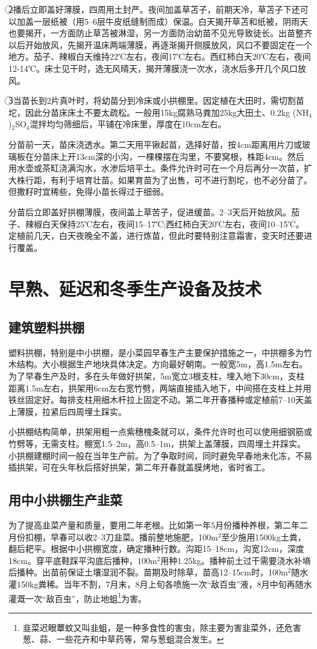 \documentclass{ctexbook}
\begin{document}
\textcircled{2}播后立即盖好薄膜，四周用土封严。夜间加盖草苫子，前期天冷，草苫子下还可以加盖一层纸被（用5--6层牛皮纸缝制而成）保温。白天揭开草苫和纸被，阴雨天也要揭开，一方面防止草苫被淋湿，另一方面防治幼苗不见光导致徒长。出苗整齐以后开始放风，先揭开温床两端薄膜，再逐渐揭开侧膜放风，风口不要固定在一个地方。茄子、辣椒白天维持22℃左右，夜间17℃左右。西红柿白天20℃左右，夜间12-14℃。床士见干时，选无风晴天，揭开薄膜浇一次水，浇水后多开几个风口放风。

\textcircled{3}当苗长到2片真叶时，将幼苗分到冷床或小拱棚里。因定植在大田时，需切割苗坨，因此分苗床床土不要太疏松。一般用15kg腐熟马粪加25kg大田土、0.2kg (NH$_4$)$_2$SO$_4$混拌均匀筛细后，平铺在冷床里，厚度在10cm左右。

分苗前一天，苗床浇透水。第二天用平锹起苗，选择好苗，按4cm距离用片刀或玻璃板在分苗床上开13cm深的小沟，一棵棵摆在沟里，不要窝根，株距4cm。然后用水壶或茶缸浇满沟水，水渗后培平土。条件允许时可在一个月后再分一次苗，扩大株行距，有利于培育壮苗。如果育苗为了出售，可不进行割坨，也不必分苗了。但撒籽时宜稀些，免得小苗长得过于细弱。

分苗后立即盖好拱棚薄膜，夜间盖上草苦子，促进缓苗。2--3天后开始放风。茄子、辣椒白天保持25℃左右，夜间15--17℃;西红柿白天20℃左右，夜间10--15℃。定植前几天，白天夜晚全不盖，进行炼苗，但此时要特别注意霜害，变天时还要进行覆盖。
\section{早熟、延迟和冬季生产设备及技术}
\subsection{建筑塑料拱棚}
塑料拱棚，特别是中小拱棚，是小菜园早春生产主要保护措施之一，中拱棚多为竹木结构。大小根据生产地块具体决定。方向最好朝南。一般宽5m，高1.5m左右。为了早春生产及时，多在头年做好拱架，5m宽立3根支柱，埋入地下30cm，支柱距离1.5m左右，拱架用6cm左右宽竹劈，两端直接插入地下，中间搭在支柱上并用铁丝固定好。每排支柱用细木杆拉上固定不动。第二年开春播种或定植前7--10天盖上薄膜，拉紧后四周埋土踩实。

小拱棚结构简单，拱架用粗一点紫穗槐条就可以，条件允许时也可以使用细钢筋或竹劈等，无需支柱。棚宽1.5--2m，高0.5--1m，拱架上盖薄膜，四周埋土并踩实。小拱棚建棚时间一般在当年生产前。为了争取时间，同时避免早春地未化冻，不易插拱架，可在头年秋后搭好拱架，第二年开春就盖膜烤地，省时省工。
\subsection{用中小拱棚生产韭菜}
为了提高韭菜产量和质量，要用二年老根。比如第一年5月份播种养根，第二年二月份扣棚，早春可以收2--3刀韭菜。播前整地施肥，100m$^2$至少施用1500kg土粪，翻后耙平。根据中小拱棚宽度，确定播种行数。沟距15--18cm，沟宽12cm，深度18cm。穿平底鞋踩平沟底后播种，100m$^2$用种1.25kg。播种前土过干需要浇水补墒后播种。出苗前保证土壤湿润不裂。苗期及时除草，苗高12--15cm时，100m$^2$随水灌150kg粪稀。当年不割，7月末，8月上旬各喷施一次“敌百虫”液，8月中旬再随水灌溉一次“敌百虫”，防止地蛆\footnote{韭菜迟眼蕈蚊又叫韭蛆，是一种多食性的害虫，除主要为害韭菜外，还危害葱、蒜、一些花卉和中草药等，常与葱蛆混合发生。}为害。
\end{document}

